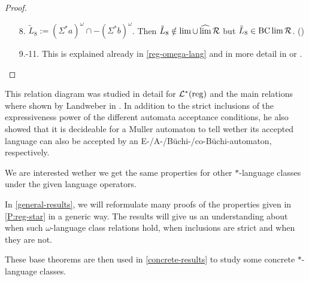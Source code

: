 \begin{theorem}[Landweber]
\begin{proof}
\begin{enumerate}
\item[8.]
$\tilde{L}_8 := (\Sigma^*a)^\omega \cap -(\Sigma^*b)^\omega$. Then $\tilde{L}_8 \notin \lim \cup \operatorname{\widehat{lim}} \mathcal{R}$ but $\tilde{L}_8 \in \operatorname{BC} \lim \mathcal{R}$. (\cite[prop, p.38]{InfCompR101})

\item[9.-11.]
This is explained already in \cref{reg-omega-lang} and in more detail in \cite{InfCompR101} or \cite[Theorem 3.1]{CombR107}.

\end{enumerate}
\end{proof}
\end{theorem}


This relation diagram was studied in detail for $\mathcal{L}^*(\textup{\textrm{reg}})$ and the main relations where shown by Landweber in \cite{Landweber69}. In addition to the strict inclusions of the expressiveness power of the different automata acceptance conditions, he also showed that it is decideable for a Muller automaton to tell wether its accepted language can also be accepted by an E-/A-/Büchi-/co-Büchi-automaton, respectively.

We are interested wether we get the same properties for other $*$-language classes under the given language operators.


In \cref{general-results}, we will reformulate many proofs of the properties given in \cref{P:reg-star} in a generic way. The results will give us an understanding about when such $\omega$-language class relations hold, when inclusions are strict and when they are not.

These base theorems are then used in \cref{concrete-results} to study some concrete $*$-language classes.
